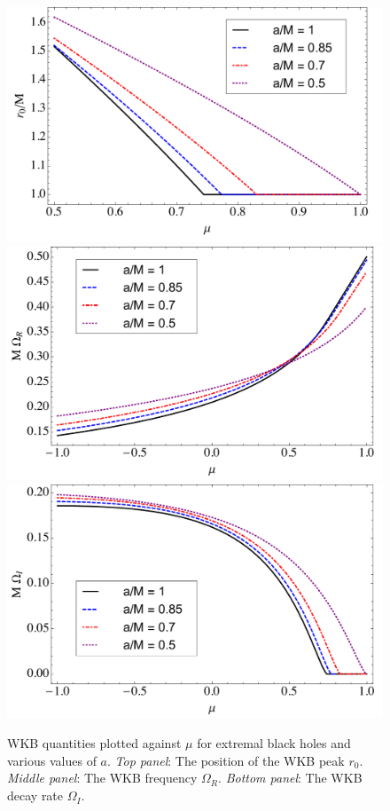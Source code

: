 \begin{refsection}
\begin{figure}[tb]
\includegraphics[width = .8 \columnwidth]{chapter_extremal/etc/KNPeak} \\
\includegraphics[width = .8 \columnwidth]{chapter_extremal/etc/KNOmegaR} \\
\includegraphics[width = .8 \columnwidth]{chapter_extremal/etc/ExKNDecay}
\caption{WKB quantities plotted against $\mu$ for extremal black holes and various values of $a$. {\it Top panel}: The position of the WKB peak $r_0$. {\it Middle panel}: The WKB frequency $\Omega_R$. {\it Bottom panel}: The WKB decay rate $\Omega_I$.}
\label{fig:ExWKB}
\end{figure}



\end{refsection}
